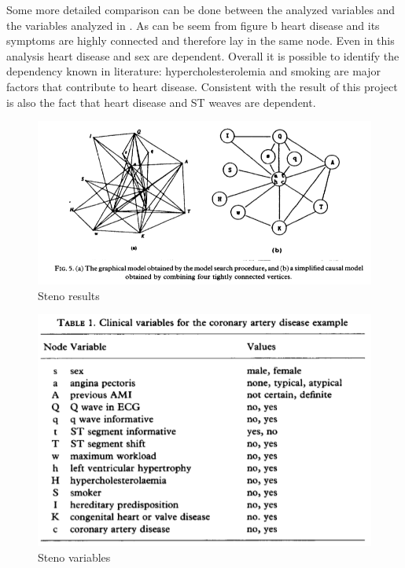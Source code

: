 \documentclass{article}
\begin{document}
Some more detailed comparison can be done between the analyzed variables and the variables analyzed in \cite{Steno}. As can be seem from figure b heart disease and its symptoms are highly connected and therefore lay in the same node. Even in this analysis heart disease and sex are dependent. Overall it is possible to identify the dependency known in literature: hypercholesterolemia and smoking are major factors that contribute to heart disease. Consistent with the result of this project is also the fact that heart disease and ST weaves are dependent.
\begin{figure}[H]
       \centering
       \includegraphics[width=1\textwidth]{Steno graph.PNG}
       \caption{Steno results \cite{Steno}}
\end{figure}

\begin{figure}[H]
       \centering
       \includegraphics[width=1\textwidth]{steno variables.PNG}
       \caption{Steno variables \cite{Steno}}
\end{figure}
\end{document}
